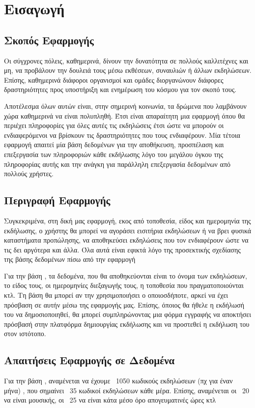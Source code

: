 ﻿\section{Εισαγωγή}

\subsection{Σκοπός Εφαρμογής}

Οι σύγχρονες πόλεις, καθημερινά, δίνουν την δυνατότητα σε πολλούς
καλλιτέχνες και μη, να προβάλουν την δουλειά τους μέσω εκθέσεων,
συναυλιών ή άλλων εκδηλώσεων. Επίσης, καθημερινά διάφοροι οργανισμοί
και ομάδες διοργανώνουν διάφορες δραστηριότητες προς υποστήριξη και
ενημέρωση του κόσμου για τον σκοπό τους.

Αποτέλεσμα όλων αυτών είναι, στην σημερινή κοινωνία, τα δρώμενα που
λαμβάνουν χώρα καθημερινά να είναι πολυπληθή. Έτσι είναι απαραίτητη
μια εφαρμογή όπου θα περιέχει πληροφορίες για όλες αυτές τις
εκδηλώσεις έτσι ώστε να μπορούν οι ενδιαφερόμενοι να βρίσκουν τις
δραστηριότητες που τους ενδιαφέρουν. Μία τέτοια εφαρμογή απαιτεί μία
βάση δεδομένων για την αποθήκευση, προσπέλαση και επεξεργασία των
πληροφοριών κάθε εκδήλωσης λόγο του μεγάλου όγκου της πληροφορίας
αυτής και την ανάγκη για παράλληλη επεξεργασία δεδομένων από πολλούς
χρήστες.

\subsection{Περιγραφή Εφαρμογής}

Συγκεκριμένα, στη δική μας εφαρμογή, εκος από τοποθεσία, είδος και
ημερομηνία της εκδήλωσης, ο χρήστης θα μπορεί να αγοράσει εισιτήρια
εκδηλώσεων ή να βρει φυσικά καταστήματα προπώλησης, να αποθηκεύσει
εκδηλώσεις που τον ενδιαφέρουν ώστε να τις δει αργότερα και άλλα. Όλα
αυτά είναι εφικτά λόγο της προσεκτικής σχεδίασης της βάσης δεδομένων
πίσω από την εφαρμογή

Για την βάση \titlos, τα δεδομένα, που θα αποθηκεύονται είναι το όνομα
των εκδηλώσεων, το είδος τους, οι ημερομηνίες διεξαγωγής τους, η
τοποθεσία που πραγματοποιούνται κτλ. Τη βάση θα μπορεί αν την
χρησιμοποιήσει ο οποιοσδήποτε, αρκεί να έχει πρόσβαση σε αυτήν μέσω
της εφαρμογής μας. Επίσης, όποιος
θα ήθελε η εκδήλωσή του να δημοσιοποιηθεί, θα μπορεί συμπληρώνοντας
μια φόρμα εγγραφής να αποκτήσει πρόσβασή στην πλατφόρμα δημιουργίας
εκδήλωσης και να προστεθεί η εκδήλωση του στον ιστότοπο.

\subsection{Απαιτήσεις Εφαρμογής σε Δεδομένα}

Για την βάση \titlos, αναμένεται να έχουμε ~1050 κωδικούς εκδηλώσεων
(πχ για έναν μήνα) , που σημαίνει ~35 κωδικοί εκδηλώσεων κάθε
μέρα. Επίσης, αναμένεται οι ~20 να είναι μουσικής, οι ~25 να είναι
κάτα μέσο όρο απογευματινές ώρες κτλ



